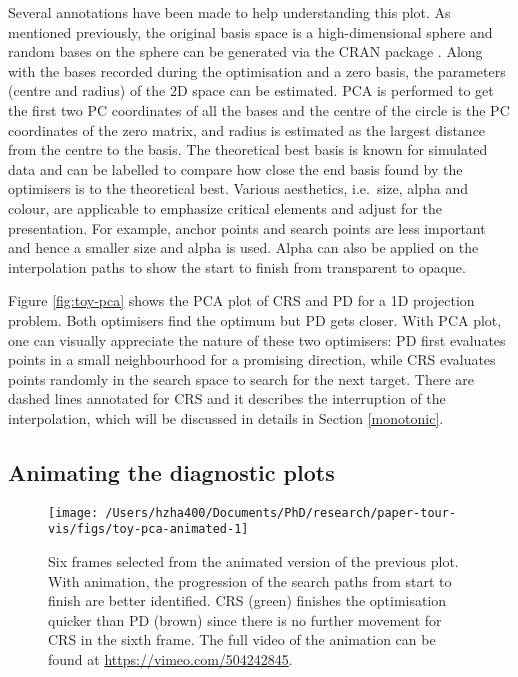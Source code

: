 Several annotations have been made to help understanding this plot. As
mentioned previously, the original basis space is a high-dimensional
sphere and random bases on the sphere can be generated via the CRAN
package  \citep{geozoo}. Along with the bases recorded
during the optimisation and a zero basis, the parameters (centre and
radius) of the 2D space can be estimated. PCA is performed to get the
first two PC coordinates of all the bases and the centre of the circle
is the PC coordinates of the zero matrix, and radius is estimated as the
largest distance from the centre to the basis. The theoretical best
basis is known for simulated data and can be labelled to compare how
close the end basis found by the optimisers is to the theoretical best.
Various aesthetics, i.e.~size, alpha and colour, are applicable to
emphasize critical elements and adjust for the presentation. For
example, anchor points and search points are less important and hence a
smaller size and alpha is used. Alpha can also be applied on the
interpolation paths to show the start to finish from transparent to
opaque.

Figure \ref{fig:toy-pca} shows the PCA plot of CRS and PD for a 1D
projection problem. Both optimisers find the optimum but PD gets closer.
With PCA plot, one can visually appreciate the nature of these two
optimisers: PD first evaluates points in a small neighbourhood for a
promising direction, while CRS evaluates points randomly in the search
space to search for the next target. There are dashed lines annotated
for CRS and it describes the interruption of the interpolation, which
will be discussed in details in Section \ref{monotonic}.

\hypertarget{animating-the-diagnostic-plots}{%
\subsection{Animating the diagnostic
plots}\label{animating-the-diagnostic-plots}}

\begin{Schunk}
\begin{figure}

{\centering \texttt{[image: /Users/hzha400/Documents/PhD/research/paper-tour-vis/figs/toy-pca-animated-1]} 

}

\caption{Six frames selected from the animated version of the previous plot. With animation, the progression of the search paths from start to finish are better identified. CRS (green) finishes the optimisation quicker than PD (brown) since there is no further movement for CRS in the sixth frame. The full video of the animation can be found at \url{https://vimeo.com/504242845}.}\label{fig:toy-pca-animated}
\end{figure}
\end{Schunk}

